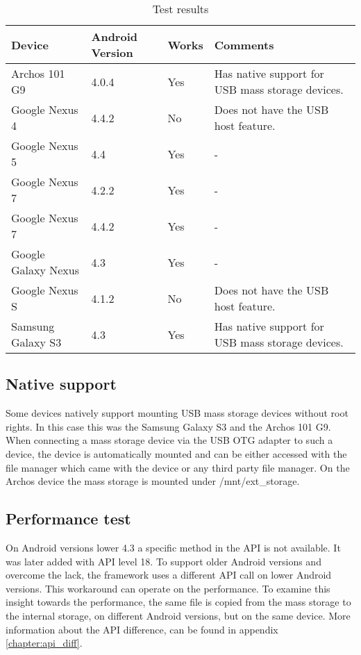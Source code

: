 \begin{table}[ht]
\caption{Test results}
\centering
\begin{tabular}{|l|l|l|p{6cm}|}
\hline\hline
\textbf{Device} & \textbf{Android Version} & \textbf{Works} & \textbf{Comments} \\ \hline
Archos 101 G9 & 4.0.4 & Yes & Has native support for USB mass storage devices. \\ \hline
Google Nexus 4 & 4.4.2 & No & Does not have the USB host feature\cite{nexus_4_usb_host}. \\ \hline
Google Nexus 5 & 4.4 & Yes & - \\ \hline
Google Nexus 7 & 4.2.2 & Yes & - \\ \hline
Google Nexus 7 & 4.4.2 & Yes & - \\ \hline
Google Galaxy Nexus & 4.3 & Yes & - \\ \hline
Google Nexus S & 4.1.2 & No & Does not have the USB host feature. \\ \hline
Samsung Galaxy S3 & 4.3 & Yes & Has native support for USB mass storage devices. \\ \hline
\end{tabular}
\label{table:test_results}
\end{table}

\subsection{Native support}

Some devices natively support mounting USB mass storage devices without root rights. In this case this was the Samsung Galaxy S3 and the Archos 101 G9. When connecting a mass storage device via the USB OTG adapter to such a device, the device is automatically mounted and can be either accessed with the file manager which came with the device or any third party file manager. On the Archos device the mass storage is mounted under /mnt/ext\_storage.

\subsection{Performance test}

On Android versions lower 4.3 a specific method in the API is not available. It was later added with API level 18. To support older Android versions and overcome the lack, the framework uses a different API call on lower Android versions. This workaround can operate on the performance. To examine this insight towards the performance, the same file is copied from the mass storage to the internal storage, on different Android versions, but on the same device. More information about the API difference, can be found in appendix \ref{chapter:api_diff}.

